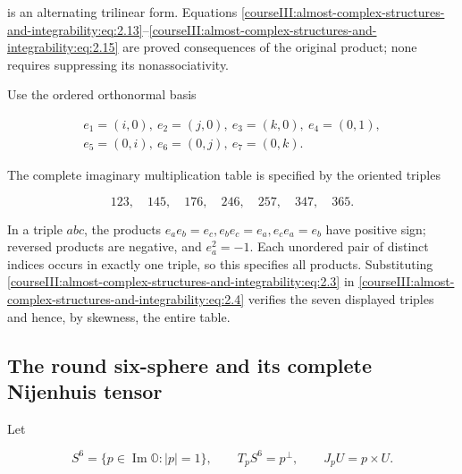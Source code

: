 is an alternating trilinear form. Equations \eqref{courseIII:almost-complex-structures-and-integrability:eq:2.13}--\eqref{courseIII:almost-complex-structures-and-integrability:eq:2.15} are proved consequences of the original product; none requires suppressing its nonassociativity.

Use the ordered orthonormal basis

\begin{equation}
\begin{gathered}
e_1=(i,0),\ e_2=(j,0),\ e_3=(k,0),\ e_4=(0,1),\\
e_5=(0,i),\ e_6=(0,j),\ e_7=(0,k).
\end{gathered}
\label{courseIII:almost-complex-structures-and-integrability:eq:2.16}
\end{equation}

The complete imaginary multiplication table is specified by the oriented triples

\begin{equation}
123,\quad145,\quad176,\quad246,\quad257,\quad347,\quad365.
\label{courseIII:almost-complex-structures-and-integrability:eq:2.17}
\end{equation}

In a triple \(abc\), the products \(e_ae_b=e_c,e_be_c=e_a,e_ce_a=e_b\) have positive sign; reversed products are negative, and \(e_a^2=-1\). Each unordered pair of distinct indices occurs in exactly one triple, so this specifies all products. Substituting \eqref{courseIII:almost-complex-structures-and-integrability:eq:2.3} in \eqref{courseIII:almost-complex-structures-and-integrability:eq:2.4} verifies the seven displayed triples and hence, by skewness, the entire table.

\subsection{The round six-sphere and its complete Nijenhuis tensor}
\label{courseIII:almost-complex-structures-and-integrability:round-sphere-obstruction}

\label{courseIII:almost-complex-structures-and-integrability:section-3}

Let

\begin{equation}
S^6=\{p\in\operatorname{Im}\mathbb O:|p|=1\},
\qquad T_pS^6=p^\perp,
\qquad J_pU=p\times U.
\label{courseIII:almost-complex-structures-and-integrability:eq:3.1}
\end{equation}

